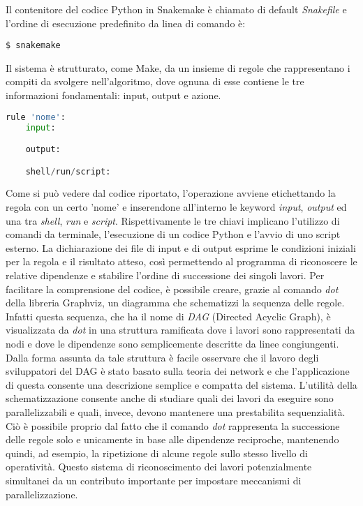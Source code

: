 Il contenitore del codice Python in Snakemake è chiamato di default \textit{Snakefile} e l'ordine di esecuzione predefinito da linea di comando è:
\begin{lstlisting}
$ snakemake
\end{lstlisting}
Il sistema è strutturato, come Make, da un insieme di regole che rappresentano i compiti da svolgere nell'algoritmo, dove ognuna di esse contiene le tre informazioni fondamentali: input, output e azione.
\begin{lstlisting}[language=Python]
rule 'nome':
	input:

	output:

	shell/run/script:

\end{lstlisting}
Come si può vedere dal codice riportato, l'operazione avviene etichettando la regola con un certo 'nome' e inserendone all'interno le keyword \textit{input}, \textit{output} ed una tra \textit{shell}, \textit{run} e \textit{script}.
Rispettivamente le tre chiavi implicano l'utilizzo di comandi da terminale, l'esecuzione di un codice Python e l'avvio di uno script esterno.
La dichiarazione dei file di input e di output esprime le condizioni iniziali per la regola e il risultato atteso, così permettendo al programma di riconoscere le relative dipendenze e stabilire l'ordine di successione dei singoli lavori.
Per facilitare la comprensione del codice, è possibile creare, grazie al comando \textit{dot} della libreria Graphviz, un diagramma che schematizzi la sequenza delle regole.
Infatti questa sequenza, che ha il nome di \textit{DAG} (Directed Acyclic Graph), è visualizzata da \textit{dot} in una struttura ramificata dove i lavori sono rappresentati da nodi e dove le dipendenze sono semplicemente descritte da linee congiungenti. 
Dalla forma assunta da tale struttura è facile osservare che il lavoro degli sviluppatori del DAG è stato basato sulla teoria dei network e che l'applicazione di questa consente una descrizione semplice e compatta del sistema. 
L'utilità della schematizzazione consente anche di studiare quali dei lavori da eseguire sono parallelizzabili e quali, invece, devono mantenere una prestabilita sequenzialità. 
Ciò è possibile proprio dal fatto che il comando \textit{dot} rappresenta la successione delle regole solo e unicamente in base alle dipendenze reciproche, mantenendo quindi, ad esempio, la ripetizione di alcune regole sullo stesso livello di operatività.
Questo sistema di riconoscimento dei lavori potenzialmente simultanei da un contributo importante per impostare meccanismi di parallelizzazione. 

